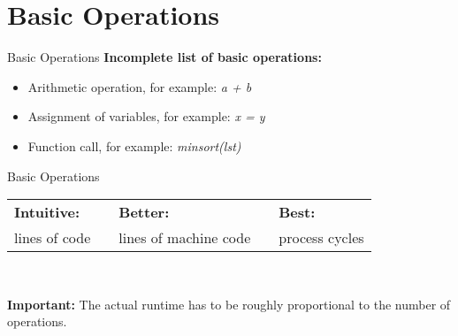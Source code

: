 \section{Basic Operations}

\begin{frame}{Basic Operations}
  \textbf{Incomplete list of basic operations:}
  \begin{center}
    \begin{itemize}
      \item
        Arithmetic operation, for example: \textit{a + b}
      \item
        Assignment of variables, for example: \textit{x = y}
      \item
        Function call, for example: \textit{minsort(lst)}
    \end{itemize}
  \end{center}
\end{frame}


\begin{frame}{Basic Operations}
  \begin{tabularx}{\textwidth}{@{}XcXcX@{}}
    \cellcolor{MainA} {\color{white}\textbf{Intuitive:}} &
    {} &
    \cellcolor{MainA} {\color{white}\textbf{Better:}} &
    {} &
    \cellcolor{MainA} {\color{white}\textbf{Best:}}\\[0.5em]
    \rule{0pt}{1.25em}\cellcolor{MainALight}lines of code &
    {} &
    \cellcolor{MainALight}lines of machine code &
    {} &
    \cellcolor{MainALight}process cycles
  \end{tabularx}\\[1.5em]
  \begin{alertblock}{\textbf{Important:}}
    The actual runtime has to be roughly proportional
    to the number of operations.
  \end{alertblock}
\end{frame}